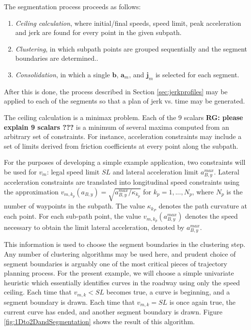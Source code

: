 \documentclass[letterpaper, 10 pt, conference]{ieeeconf}  %
\begin{document}
The segmentation process proceeds as follows:
\begin{enumerate} \label{asdf}
  \item \emph{Ceiling calculation}, where 
initial/final speeds, speed limit, peak acceleration and jerk 
are found for every point in the given subpath.
  \item \emph{Clustering}, in which subpath points are grouped sequentially and the segment boundaries are determined..
  \item \emph{Consolidation}, in which a single $\mathbf{b}$, $\mathbf{a}_m$, and $\mathbf{j}_m$ is selected for each segment.
\end{enumerate}
After this is done, the process described in Section \ref{sec:jerkprofiles} may be applied to each of the segments so that a plan of jerk vs. time may be generated.

The ceiling calculation is a minimax problem.
Each of the 9 scalars \textbf{RG: please explain 9 scalars ???} is a minimum of several maxima computed from an arbitrary set of constraints.
For instance, acceleration constraints may include a set of limits derived from friction coefficients at every point along the subpath.

For the purposes of developing a simple example application, two constraints will be used for $v_{m}$: legal speed limit $SL$ and lateral acceleration limit $a_{B,y}^{max}$. 
Lateral acceleration constraints are translated into longitudinal speed constraints using the approximation $v_{m,k_p}(a_{B,y}) = \sqrt{a_{B,y}^{max}/\kappa_{k_p}}$ for $k_p = 1, ..., N_p$, where $N_p$ is the number of waypoints in the subpath.
The value $\kappa_{k_P}$ denotes the path curvature at each point.
For each sub-path point, the value $v_{m,k_p}(a_{B,y}^{max})$ denotes the speed necessary to obtain the limit lateral acceleration, denoted by $a^{max}_{B,y}$.

This information is used to choose the segment boundaries in the clustering step.
Any number of clustering algorithms may be used here, and prudent choice of segment boundaries is arguably one of the most critical pieces of trajectory planning process.
For the present example, we will choose a simple univariate heuristic which essentially identifies curves in the roadway using only the speed ceiling.
Each time that $v_{m,k} < SL$ becomes true, a curve is beginning, and a segment boundary is drawn.
Each time that $v_{m,k} = SL$ is once again true, the current curve has ended, and another segment boundary is drawn.
Figure \ref{fig:1Dto2DandSegmentation} shows the result of this algorithm. 
\end{document}
